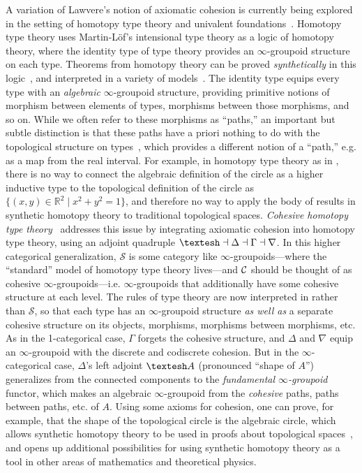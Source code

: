\documentclass{drl-common/llncs}
\begin{document}
A variation of Lawvere's notion of axiomatic cohesion is currently being
explored in the setting of homotopy type theory and univalent
foundations~\citep{voevodsky06note,uf13hott-book}.  Homotopy type theory
uses Martin-L\"of's intensional type theory as a logic of homotopy
theory, where the identity type of type theory provides an
$\infty$-groupoid structure on each type.  Theorems from homotopy theory
can be proved \emph{synthetically} in this
logic~\citep{ls13pi1s1,lb13pinsn,...}, and interpreted in a variety of
models~\citep{...}.  The identity type equips every type with an
\emph{algebraic} $\infty$-groupoid structure, providing primitive
notions of morphism between elements of types, morphisms between those
morphisms, and so on.  While we often refer to these morphisms as
``paths,'' an important but subtle distinction is that these paths have
a priori nothing to do with the topological structure on
types~\citep{scott,etc}, which provides a different notion of a
``path,'' e.g. as a map from the real interval.  For example, in
homotopy type theory as in \citep{uf13hott-book}, there is no way to
connect the algebraic definition of the circle as a higher inductive
type to the topological definition of the circle as $\{ (x,y) \in
\mathbb{R}^2 \mid x^2 + y^2 = 1\}$, and therefore no way to apply the
body of results in synthetic homotopy theory to traditional topological
spaces.  \emph{Cohesive homotopy type theory}~\citep{ss12,shulman15}
addresses this issue by integrating axiomatic cohesion into homotopy
type theory, using an adjoint quadruple $\sh \la \Delta \la \Gamma \la
\nabla$.  In this higher categorical generalization, $\mathcal{S}$ is
some category like $\infty$-groupoids---where the ``standard'' model of
homotopy type theory lives---and $\mathcal{C}$ should be thought of as cohesive
$\infty$-groupoids---i.e. $\infty$-groupoids that additionally have some
cohesive structure at each level.  The rules of type theory are now
interpreted in \C rather than $\mathcal{S}$, so that each type has an
$\infty$-groupoid structure \emph{as well as} a separate cohesive
structure on its objects, morphisms, morphisms between morphisms, etc.
As in the 1-categorical case, $\Gamma$ forgets the cohesive structure,
and $\Delta$ and $\nabla$ equip an $\infty$-groupoid with the discrete
and codiscrete cohesion.  But in the $\infty$-categorical case,
$\Delta$'s left adjoint $\sh A$ (pronounced ``shape of $A$'')
generalizes from the connected components to the \emph{fundamental
  $\infty$-groupoid} functor, which makes an algebraic $\infty$-groupoid
from the \emph{cohesive} paths, paths between paths, etc. of $A$.  Using
some axioms for cohesion, one can prove, for example, that the shape of
the topological circle is the algebraic circle, which allows synthetic
homotopy theory to be used in proofs about topological
spaces~\citep{s15}, and opens up additional possibilities for using
synthetic homotopy theory as a tool in other areas of mathematics and
theoretical physics.
\end{document}
